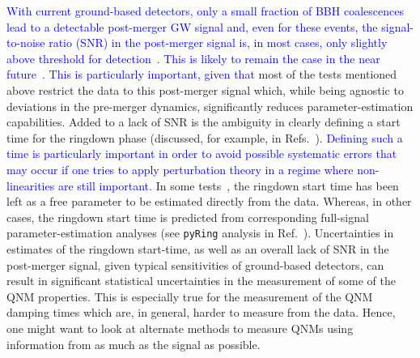 \documentclass[twocolumn,prd,aps,superscriptaddress,preprintnumbers,tightenlines,showpacs,nofootinbib,eqsecnum,amsfonts,amsmath]{revtex4-1}
\begin{document}
\textcolor{blue}{With current ground-based detectors, only a small fraction of BBH coalescences lead to a detectable post-merger GW signal and, even for these events, the signal-to-noise ratio (SNR) in the post-merger signal is, in most cases, only slightly above threshold for detection~\cite{LIGOScientific:2019fpa,Abbott:2020jks}. This is likely to remain the case in the near future~\cite{Berti:2016lat}.}
%
\textcolor{blue}{This is particularly important, given that} most of the tests mentioned above restrict the data to this post-merger signal which, while being agnostic to deviations in the pre-merger dynamics, significantly reduces parameter-estimation capabilities. Added to a lack of SNR is the ambiguity in clearly defining a start time for the ringdown phase (discussed, for example, in Refs.~\cite{Berti:2007fi,Baibhav:2017jhs,Bhagwat:2017tkm}). \textcolor{blue}{Defining such a time is particularly important in order to avoid possible systematic errors that may occur if one tries to apply perturbation theory in a regime where non-linearities are still important}. In some tests~\cite{Carullo:2018gah,Carullo:2019flw}, the ringdown start time has been left as a free parameter to be estimated directly from the data. Whereas, in other cases, the ringdown start time is predicted from corresponding full-signal parameter-estimation analyses (see \texttt{pyRing} analysis in Ref.~\cite{Abbott:2020jks}). Uncertainties
in estimates of the ringdown start-time, as well as an overall lack of
SNR in the post-merger signal, given typical sensitivities of
ground-based detectors, can result in significant statistical uncertainties in the measurement of some of the QNM properties. This is especially true for the measurement of the QNM damping times which are, in general, harder to measure from the data. Hence, one might want to look at alternate methods to measure QNMs using information from as much as the signal as possible.
\end{document}
